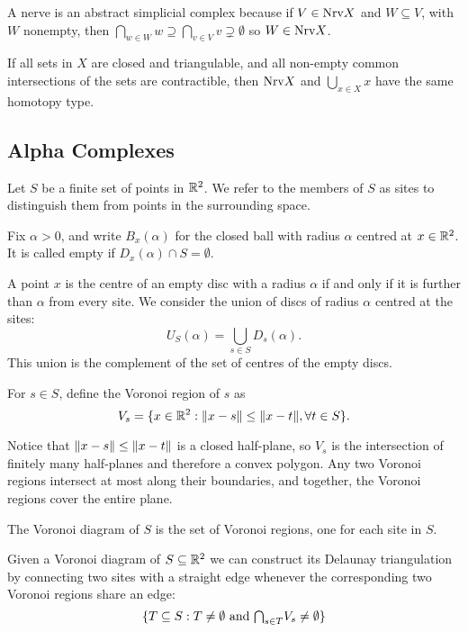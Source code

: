 A nerve is an abstract simplicial complex because if $V \in \textrm{Nrv} X$ and $W \subseteq V$, with $W$ nonempty, then $\bigcap_{w \in W} w \supseteq \bigcap_{v \in V} v \supsetneq \emptyset$ so $W \in \textrm{Nrv} X$.

\begin{theorem}
If all sets in $X$ are closed and triangulable, and all non-empty common intersections of the sets are contractible, then $\textrm{Nrv} X$ and $\bigcup_{x \in X} x$ have the same homotopy type.
\end{theorem}


\subsection{Alpha Complexes}

Let $S$ be a finite set of points in $\mathbb{R}^2$. We refer to the members of $S$ as sites to distinguish them from points in the surrounding space.

Fix $\alpha > 0$, and write $B_x(\alpha)$ for the closed ball with radius $\alpha$ centred at $x \in \mathbb{R}^2$. It is called empty if $D_x(\alpha) \cap S = \emptyset$.

A point $x$ is the centre of an empty disc with a radius $\alpha$ if and only if it is further than $\alpha$ from every site. We consider the union of discs of radius $\alpha$ centred at the sites:
$$
U_S(\alpha) = \bigcup_{s \in S} D_s(\alpha).
$$
This union is the complement of the set of centres of the empty discs.

\begin{definition}
For $s \in S$, define the Voronoi region of $s$ as
$$
V_s = \{x \in \mathbb{R}^2 : \lVert x-s\rVert \leq \lVert x-t\rVert, \forall t \in S\}.
$$
\end{definition}

Notice that $\lVert x - s\rVert \leq \lVert x - t\rVert$ is a closed half-plane, so $V_s$ is the intersection of finitely many half-planes and therefore a convex polygon. Any two Voronoi regions intersect at most along their boundaries, and together, the Voronoi regions cover the entire plane.

\begin{definition}
The Voronoi diagram of $S$ is the set of Voronoi regions, one for each site in $S$.
\end{definition}

\begin{definition}
Given a Voronoi diagram of $S \subseteq \mathbb{R}^2$ we can construct its Delaunay triangulation by connecting two sites with a straight edge whenever the corresponding two Voronoi regions share an edge:
$$
\{T \subseteq S: T \not= \emptyset \text{ and } \mathsmaller{\bigcap}_{s \in T} V_s \not = \emptyset\}
$$
\end{definition}

